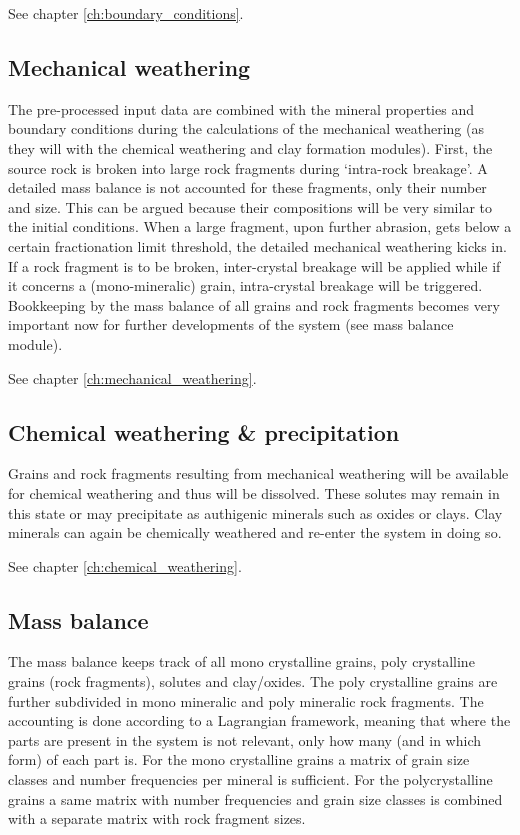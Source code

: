     See chapter \ref{ch:boundary_conditions}. %

    \subsection{Mechanical weathering}
    The pre-processed input data are combined with the mineral properties and boundary conditions during the calculations of the mechanical weathering (as they will with the chemical weathering and clay formation modules). %
    First, the source rock is broken into large rock fragments during ‘intra-rock breakage’. %
    A detailed mass balance is not accounted for these fragments, only their number and size. %
    This can be argued because their compositions will be very similar to the initial conditions. %
    When a large fragment, upon further abrasion, gets below a certain fractionation limit threshold, the detailed mechanical weathering kicks in. %
    If a rock fragment is to be broken, inter-crystal breakage will be applied while if it concerns a (mono-mineralic) grain, intra-crystal breakage will be triggered. %
    Bookkeeping by the mass balance of all grains and rock fragments becomes very important now for further developments of the system (see mass balance module). %

    See chapter \ref{ch:mechanical_weathering}. %

    \subsection{Chemical weathering \& precipitation}
    Grains and rock fragments resulting from mechanical weathering will be available for chemical weathering and thus will be dissolved. %
    These solutes may remain in this state or may precipitate as authigenic minerals such as oxides or clays. %
    Clay minerals can again be chemically weathered and re-enter the system in doing so. %

    See chapter \ref{ch:chemical_weathering}. %

    \subsection{Mass balance}
    The mass balance keeps track of all mono crystalline grains, poly crystalline grains (rock fragments), solutes and clay/oxides. %
    The poly crystalline grains are further subdivided in mono mineralic and poly mineralic rock fragments. %
    The accounting is done according to a Lagrangian framework, meaning that where the parts are present in the system is not relevant, only how many (and in which form) of each part is. %
    For the mono crystalline grains a matrix of grain size classes and number frequencies per mineral is sufficient. %
    For the polycrystalline grains a same matrix with number frequencies and grain size classes is combined with a separate matrix with rock fragment sizes. %

